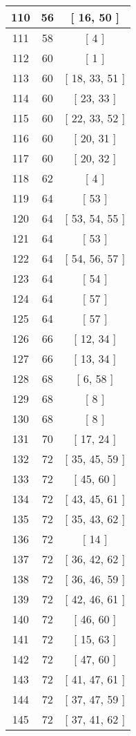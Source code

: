 \begin{center}
\begin{longtable}[H]{|| c c c ||}
\hline
110 & 56 & [ 16, 50 ] \\ 
\hline
111 & 58 & [ 4 ] \\ 
\hline
112 & 60 & [ 1 ] \\ 
\hline
113 & 60 & [ 18, 33, 51 ] \\ 
\hline
114 & 60 & [ 23, 33 ] \\ 
\hline
115 & 60 & [ 22, 33, 52 ] \\ 
\hline
116 & 60 & [ 20, 31 ] \\ 
\hline
117 & 60 & [ 20, 32 ] \\ 
\hline
118 & 62 & [ 4 ] \\ 
\hline
119 & 64 & [ 53 ] \\ 
\hline
120 & 64 & [ 53, 54, 55 ] \\ 
\hline
121 & 64 & [ 53 ] \\ 
\hline
122 & 64 & [ 54, 56, 57 ] \\ 
\hline
123 & 64 & [ 54 ] \\ 
\hline
124 & 64 & [ 57 ] \\ 
\hline
125 & 64 & [ 57 ] \\ 
\hline
126 & 66 & [ 12, 34 ] \\ 
\hline
127 & 66 & [ 13, 34 ] \\ 
\hline
128 & 68 & [ 6, 58 ] \\ 
\hline
129 & 68 & [ 8 ] \\ 
\hline
130 & 68 & [ 8 ] \\ 
\hline
131 & 70 & [ 17, 24 ] \\ 
\hline
132 & 72 & [ 35, 45, 59 ] \\ 
\hline
133 & 72 & [ 45, 60 ] \\ 
\hline
134 & 72 & [ 43, 45, 61 ] \\ 
\hline
135 & 72 & [ 35, 43, 62 ] \\ 
\hline
136 & 72 & [ 14 ] \\ 
\hline
137 & 72 & [ 36, 42, 62 ] \\ 
\hline
138 & 72 & [ 36, 46, 59 ] \\ 
\hline
139 & 72 & [ 42, 46, 61 ] \\ 
\hline
140 & 72 & [ 46, 60 ] \\ 
\hline
141 & 72 & [ 15, 63 ] \\ 
\hline
142 & 72 & [ 47, 60 ] \\ 
\hline
143 & 72 & [ 41, 47, 61 ] \\ 
\hline
144 & 72 & [ 37, 47, 59 ] \\ 
\hline
145 & 72 & [ 37, 41, 62 ] \\ 

\end{longtable}
\end{center}
